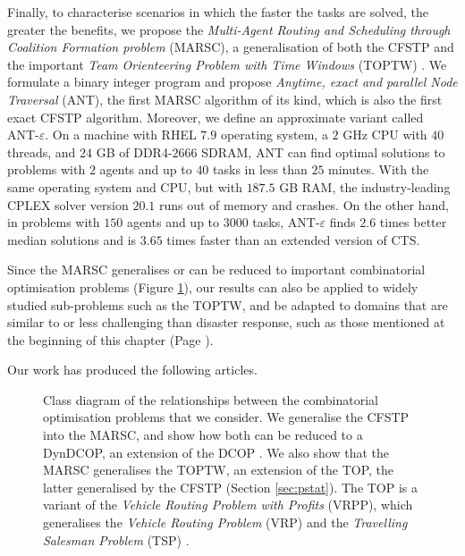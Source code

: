 Finally, to characterise scenarios in which the faster the tasks are solved, the greater
the benefits, we propose the \emph{Multi-Agent Routing and Scheduling through Coalition
Formation problem} (MARSC), a generalisation of both the CFSTP and the important
\emph{Team Orienteering Problem with Time Windows} (TOPTW) \cite{top2019}. We formulate a
binary integer program \cite{wolsey2020} and propose \emph{Anytime, exact and parallel
Node Traversal} (ANT), the first MARSC algorithm of its kind, which is also the first
exact CFSTP algorithm. Moreover, we define an approximate variant called
ANT-$\varepsilon$.
On a machine with RHEL $7.9$ operating system, a $2$ GHz CPU with $40$ threads, and $24$
GB of DDR4-$2666$ SDRAM, ANT can find optimal solutions to problems with $2$ agents and up
to $40$ tasks in less than $25$ minutes. With the same operating system and CPU, but with
$187.5$ GB RAM, the industry-leading CPLEX solver version $20.1$ runs out of memory and
crashes. On the other hand, in problems with $150$ agents and up to $3000$ tasks,
ANT-$\varepsilon$ finds $2.6$ times better median solutions and is $3.65$ times faster
than an extended version of CTS.

Since the MARSC generalises or can be reduced to important combinatorial
optimisation problems (Figure \ref{fig:relationships}), our results can also be applied to
widely studied sub-problems such as the TOPTW, and be adapted to domains that are similar
to or less challenging than disaster response, such as those mentioned at the beginning of
this chapter (Page \pageref{chap:intro}).

Our work has produced the following articles.
\clearpage

\begin{figure}[t]
    \centering
    \begin{adjustbox}{width=.7\textwidth}
        
    \end{adjustbox}
    \caption[Class diagram of the problems considered]{Class diagram of the
    relationships between the combinatorial optimisation problems that we consider.
    We generalise the CFSTP into the MARSC, and show how both can be reduced
    to a DynDCOP, an extension of the DCOP \cite{fioretto2018survey}. We also show
    that the MARSC generalises the TOPTW, an extension of the TOP, the latter
    generalised by the CFSTP (Section \ref{sec:pstat}). The TOP is a variant of the
    \emph{Vehicle Routing Problem with Profits} (VRPP), which generalises the
    \emph{Vehicle Routing Problem} (VRP) and the \emph{Travelling Salesman
    Problem} (TSP) \cite{top2019}.}
    \label{fig:relationships}
\end{figure}

